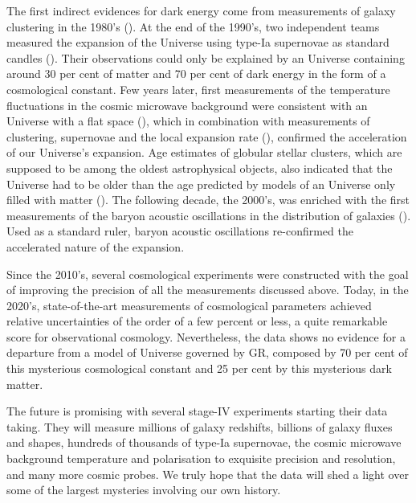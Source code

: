     The first indirect evidences for dark energy come from measurements 
    of galaxy clustering in the 1980's 
    (\cite{maddoxGalaxyCorrelationsLarge1990, 
    efstathiouCosmologicalConstantCold1990}). 
    At the end of the 1990's, two independent teams measured the expansion of 
    the Universe using type-Ia supernovae as standard candles
    (\cite{riessObservationalEvidenceSupernovae1998, 
    perlmutterMeasurementsOmegaLambda1999}). 
    Their observations could only be explained by 
    an Universe containing around 30 per cent of matter and 70 per cent of dark energy
    in the form of a cosmological constant. 
    Few years later, first measurements of the 
    temperature fluctuations in the cosmic microwave background were consistent with 
    an Universe with a flat space (\cite{balbiConstraintsCosmologicalParameters2000,
    debernardisFlatUniverse2000}), 
    which in combination with measurements of clustering, 
    supernovae and the local expansion rate (\cite{mouldHubbleSpaceTelescope2000}), 
    confirmed the acceleration of our Universe's expansion. 
    Age estimates of globular stellar clusters, which are
    supposed to be among the oldest astrophysical objects, 
    also indicated that the Universe had to be older than the age predicted 
    by models of an Universe only filled with matter (\cite{chaboyerAgeUniverse1998}). 
    The following decade, the 2000's, was enriched with the first measurements
    of the baryon acoustic oscillations in the distribution of galaxies
    (\cite{eisensteinDetectionBaryonAcoustic2005, cole2dFGalaxyRedshift2005}).
    Used as a standard ruler, baryon acoustic oscillations re-confirmed 
    the accelerated nature of the expansion.
    
    Since the 2010's, several cosmological experiments were constructed with the goal of
    improving the precision of all the measurements discussed above. 
    Today, in the 2020's, state-of-the-art measurements of cosmological parameters 
    achieved relative uncertainties of the order of a few percent or less, 
    a quite remarkable score for observational cosmology. 
    Nevertheless, the data shows no evidence for a departure from a model of Universe 
    governed by GR, composed by 70 per cent of this mysterious cosmological 
    constant and 25 per cent by this mysterious dark matter. 

    The future is promising with several stage-IV experiments starting their data taking.
    They will measure millions of galaxy redshifts, billions of galaxy fluxes and shapes, 
    hundreds of thousands of type-Ia supernovae, 
    the cosmic microwave background temperature and polarisation to exquisite 
    precision and resolution, and many more cosmic probes. 
    We truly hope that the data will shed a light over some of the largest mysteries 
    involving our own history. 



